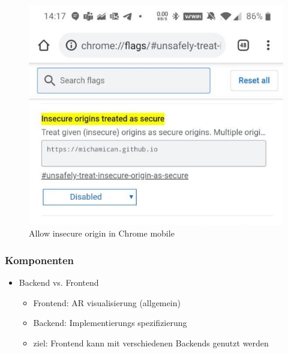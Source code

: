 \begin{figure}
	\centering
	\includegraphics[width=.75\linewidth]{images/InsecureOriginsSettings}
	\caption{Allow insecure origin in Chrome mobile}
	\label{fig:insecureOriginsSettings}
\end{figure}

%	


\subsubsection{Komponenten}

\begin{itemize}
	\item Backend vs. Frontend
	\begin{itemize}
		\item Frontend: AR visualisierung (allgemein)
		\item Backend: Implementierungs spezifizierung
		\item ziel: Frontend kann mit verschiedenen Backends genutzt werden
	\end{itemize}
\end{itemize}


